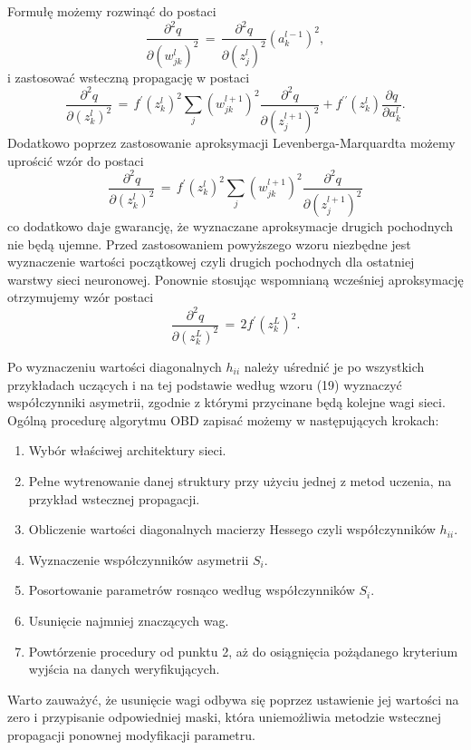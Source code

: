 Formułę możemy rozwinąć do postaci 
\begin{equation}
\frac{\partial^2 q}{\partial (w_{jk}^l)^2} \, = \, \frac{\partial^2 q}{\partial (z_j^{l})^2}(a_k^{l-1})^2 , 
\end{equation}
i zastosować wsteczną propagację w postaci
\begin{equation}
\frac{\partial^2q}{\partial (z_k^{l})^2} \, = \, f^{\prime}(z_k^l)^2 \sum_j (w_{jk}^{l+1})^2 \frac{\partial^2 q}{\partial (z_j^{l+1})^2} + f^{\prime \prime}(z_k^l) \frac{\partial q}{\partial a_k^l}. 
\end{equation}
Dodatkowo poprzez zastosowanie aproksymacji Levenberga-Marquardta możemy uprościć wzór do postaci
\begin{equation}
\frac{\partial^2q}{\partial (z_k^{l})^2} \, = \, f^{\prime}(z_k^l)^2 \sum_j (w_{jk}^{l+1})^2 \frac{\partial^2 q}{\partial (z_j^{l+1})^2}
\end{equation}
co dodatkowo daje gwarancję, że wyznaczane aproksymacje drugich pochodnych nie będą ujemne.
Przed zastosowaniem powyższego wzoru niezbędne jest wyznaczenie wartości początkowej czyli drugich pochodnych dla ostatniej warstwy sieci neuronowej. Ponownie stosując wspomnianą wcześniej aproksymację otrzymujemy wzór postaci
\begin{equation}
\frac{\partial^2q}{\partial (z_k^{L})^2} \, = \, 2f^{\prime}(z_k^{L})^2. 
\end{equation}
\par Po wyznaczeniu wartości diagonalnych \( h_{ii} \) należy uśrednić je po wszystkich przykładach uczących i na tej podstawie według wzoru (19) wyznaczyć współczynniki asymetrii, zgodnie z którymi przycinane będą kolejne wagi sieci. Ogólną procedurę algorytmu OBD zapisać możemy w następujących krokach: 
\begin{enumerate}
 \item Wybór właściwej architektury sieci.
 \item Pełne wytrenowanie danej struktury przy użyciu jednej z metod uczenia, na przykład wstecznej propagacji.
 \item Obliczenie wartości diagonalnych macierzy Hessego czyli współczynników \( h_{ii} \). 
 \item Wyznaczenie współczynników asymetrii \( S_i \).
 \item Posortowanie parametrów rosnąco według współczynników \( S_i \).
 \item Usunięcie najmniej znaczących wag.
 \item Powtórzenie procedury od punktu 2, aż do osiągnięcia pożądanego kryterium wyjścia  na danych weryfikujących.
\end{enumerate}
Warto zauważyć, że usunięcie wagi odbywa się poprzez ustawienie jej wartości na zero i przypisanie odpowiedniej maski, która uniemożliwia metodzie wstecznej propagacji ponownej modyfikacji parametru.  

